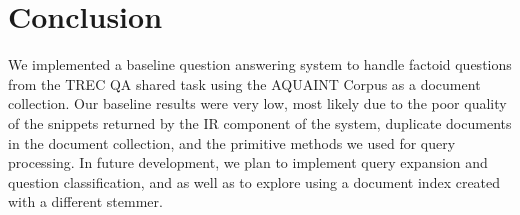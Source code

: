 \documentclass[11pt]{article}
\begin{document}
\section{Conclusion}

We implemented a baseline question answering system to handle factoid questions from the TREC QA shared task using the AQUAINT Corpus as a document collection. Our baseline results were very low, most likely due to the poor quality of the snippets returned by the IR component of the system, duplicate documents in the document collection, and the primitive methods we used for query processing. In future development, we plan to implement query expansion and question classification, and as well as to explore using a document index created with a different stemmer.

\nocite{*}




\end{document}
